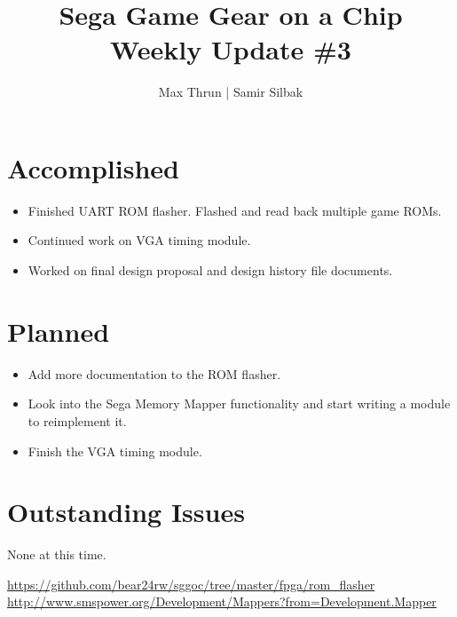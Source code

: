 \documentclass[12pt]{article}
\title{Sega Game Gear on a Chip \\ Weekly Update \#3}
\author{ Max Thrun | Samir Silbak }
\begin{document}
\maketitle

\section*{Accomplished}
\begin{itemize}
    \item Finished UART ROM flasher. Flashed and read back multiple game ROMs. \cite{flasher}
    \item Continued work on VGA timing module.
    \item Worked on final design proposal and design history file documents.
\end{itemize}

\section*{Planned}
\begin{itemize}
    \item Add more documentation to the ROM flasher.
    \item Look into the Sega Memory Mapper\cite{mapper} functionality and start writing a module to reimplement it.
    \item Finish the VGA timing  module.
\end{itemize}

\section*{Outstanding Issues}
None at this time.

\vspace{.1in}
\begin{thebibliography}{9}
     \url{https://github.com/bear24rw/sggoc/tree/master/fpga/rom_flasher}
     \url{http://www.smspower.org/Development/Mappers?from=Development.Mapper}
\end{thebibliography}
\end{document}
